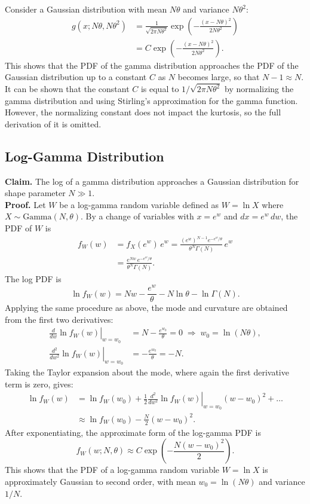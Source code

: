 Consider a Gaussian distribution with mean $N\theta$ and variance $N\theta^2$:
\begin{align}
    g(x; N\theta, N\theta^2) &= \frac{1}{\sqrt{2\pi N\theta^2}} \exp\left(-\frac{(x - N\theta)^2}{2N\theta^2}\right) \\[4pt]
    &= C \exp\left(-\frac{(x - N\theta)^2}{2N\theta^2}\right).
\end{align}
This shows that the PDF of the gamma distribution approaches the PDF of the Gaussian distribution up to a constant $C$ as $N$ becomes large, so that $N-1 \approx N$. It can be shown that the constant $C$ is equal to $1/\sqrt{2\pi N\theta^2}$ by normalizing the gamma distribution and using Stirling's approximation for the gamma function. However, the normalizing constant does not impact the kurtosis, so the full derivation of it is omitted.

\subsection{Log-Gamma Distribution}
\noindent\textbf{Claim.} The log of a gamma distribution approaches a Gaussian distribution for shape parameter $N \gg 1$.\\

\noindent\textbf{Proof.} Let $W$ be a log-gamma random variable defined as $W = \ln X$ where $X \sim \text{Gamma}(N, \theta)$. By a change of variables with
$x = e^{w}$ and $dx = e^{w}\,dw$, the PDF of $W$ is
\begin{align}
    f_W(w) &= f_X(e^{w})\,e^{w}
        = \frac{(e^{w})^{N-1} e^{-e^{w}/\theta}}{\theta^N \Gamma(N)}\,e^{w} \\[4pt]
    &= \frac{e^{Nw}\, e^{-e^{w}/\theta}}{\theta^N \Gamma(N)}.
\end{align}
The log PDF is
\begin{equation}
    \ln f_W(w) = Nw - \frac{e^{w}}{\theta} - N\ln\theta - \ln\Gamma(N).
\end{equation}
Applying the same procedure as above, the mode and curvature are obtained from the first two derivatives:
\begin{align}
    \left.\frac{d}{dw}\ln f_W(w)\right|_{w=w_0} &= N - \frac{e^{w_0}}{\theta} = 0
        \;\Rightarrow\; w_0 = \ln(N\theta), \\[4pt]
    \left.\frac{d^2}{dw^2}\ln f_W(w)\right|_{w=w_0} &= -\frac{e^{w_0}}{\theta} = -N.
\end{align}
Taking the Taylor expansion about the mode, where again the first derivative term is zero, gives:
\begin{align}
    \ln f_W(w) &= \ln f_W(w_0) + \frac{1}{2}\left.\frac{d^2}{dw^2}\ln f_W(w)\right|_{w=w_0} (w - w_0)^2 + \dots \\[4pt]
    &\approx \ln f_W(w_0) - \frac{N}{2}(w - w_0)^2.
\end{align}
After exponentiating, the approximate form of the log-gamma PDF is
\begin{equation}
    f_W(w; N, \theta) \approx C \exp\left(-\frac{N(w - w_0)^2}{2}\right).
\end{equation}
This shows that the PDF of a log-gamma random variable $W = \ln X$ is approximately Gaussian  to second order, with mean $w_0 = \ln(N\theta)$ and variance $1/N$. 

